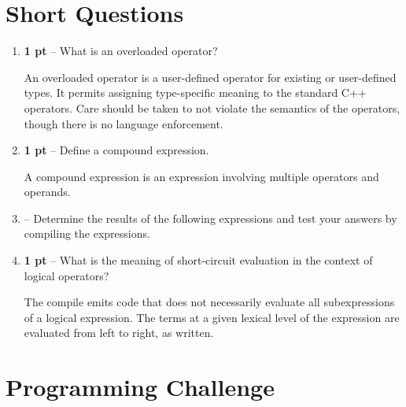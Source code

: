 \documentclass{article}
\begin{document}
\section*{Short Questions}
\begin{enumerate}
  \item \textbf{1 pt} -- What is an overloaded operator?

    An overloaded operator is a user-defined operator for existing or
    user-defined types.  It permits assigning type-specific meaning to the
    standard C++ operators.  Care should be taken to not violate the semantics
    of the operators, though there is no language enforcement.

  \item \textbf{1 pt} -- Define a compound expression.
    
    A compound expression is an expression involving multiple operators and
    operands.
    
  \item \text{1 pt} -- Determine the results of the following expressions and
    test your answers by compiling the expressions.


  \item \textbf{1 pt} -- What is the meaning of short-circuit evaluation in the
    context of logical operators?

    The compile emits code that does not necessarily evaluate all subexpressions
    of a logical expression.  The terms at a given lexical level of the
    expression are evaluated from left to right, as written.
\end{enumerate}

\section*{Programming Challenge}
\inputminted[bgcolor=lightgray]{bash}{summary-stats-output}
\end{document}
